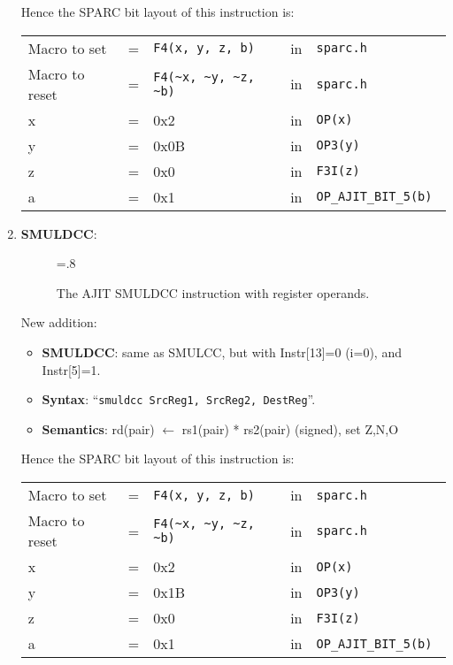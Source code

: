 \begin{enumerate}
  Hence the SPARC bit layout of this instruction is:

  \begin{tabular}[h]{lclcl}
    Macro to set   &=& \verb|F4(x, y, z, b)|     &in& \verb|sparc.h|           \\
    Macro to reset &=& \verb|F4(~x, ~y, ~z, ~b)| &in& \verb|sparc.h|           \\
    x              &=& 0x2                       &in& \verb|OP(x) |            \\
    y              &=& 0x0B                      &in& \verb|OP3(y) |           \\
    z              &=& 0x0                       &in& \verb|F3I(z) |           \\
    a              &=& 0x1                       &in& \verb|OP_AJIT_BIT_5(b) |
  \end{tabular}

\item \textbf{SMULDCC}:\\
  \begin{center}
    \begin{figure}[h]
      \centering
      \epsfxsize=.8\linewidth
      \caption{The AJIT SMULDCC instruction  with register operands.}
      \label{fig:ajit:smuldcc:insn}
    \end{figure}
  \end{center}
  New addition:
  \begin{itemize}
  \item []\textbf{SMULDCC}: same as SMULCC, but with Instr[13]=0 (i=0), and
    Instr[5]=1.
  \item []\textbf{Syntax}: ``\texttt{smuldcc  SrcReg1, SrcReg2, DestReg}''.
  \item []\textbf{Semantics}: rd(pair) $\leftarrow$ rs1(pair) *
    rs2(pair) (signed), set Z,N,O
  \end{itemize}

  Hence the SPARC bit layout of this instruction is:

  \begin{tabular}[h]{lclcl}
    Macro to set   &=& \verb|F4(x, y, z, b)|     &in& \verb|sparc.h|           \\
    Macro to reset &=& \verb|F4(~x, ~y, ~z, ~b)| &in& \verb|sparc.h|           \\
    x              &=& 0x2                       &in& \verb|OP(x) |            \\
    y              &=& 0x1B                      &in& \verb|OP3(y) |           \\
    z              &=& 0x0                       &in& \verb|F3I(z) |           \\
    a              &=& 0x1                       &in& \verb|OP_AJIT_BIT_5(b) |
  \end{tabular}


\end{enumerate}
